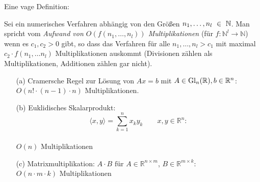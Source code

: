 Eine vage Definition:

\begin{Definition}[Aufwand]
Sei ein numerisches Verfahren abhängig von den Größen $n_1, \ldots, n_l~\in~\mathbb N$.
Man spricht vom
\emph{Aufwand von $O(f(n_1, \dots, n_l))$ Multiplikationen}
(für $f\colon \mathbb{N}^l \to \mathbb{N}$) wenn es
$c_1, c_2 > 0$ gibt, so dass das Verfahren für alle
$n_1, \dots, n_l > c_1$ mit maximal $c_2 \cdot f(n_1, \dots n_l)$
Multiplikationen auskommt (Divisionen zählen als Multiplikationen,
Additionen zählen gar nicht).
\end{Definition}

\begin{Beispiel}[name=Zahl der Multiplikationen in verschiedenen Rechnungen,listhack]
\quad
\begin{enumerate}
\item[(a)]
Cramersche Regel zur Lösung von $Ax = b$ mit $A \in \mathrm{Gl}_n(\mathbb R),
b \in \mathbb{R}^n$: \\
$O(n! \cdot (n-1)\cdot n)$ Multiplikationen.
\item[(b)]
Euklidisches Skalarprodukt:
$$\langle x,y \rangle = \sum_{k=1}^n x_k y_k \qquad x,y \in \mathbb{R}^n:$$ \\
$O(n)$ Multiplikationen
\item[(c)]
Matrixmultiplikation: $A \cdot B \text{ für } A\in
\mathbb{R}^{n \times m}$, $B \in \mathbb{R}^{m \times k}$: \\
$O(n \cdot m \cdot k ) $ Multiplikationen
\end{enumerate}
\end{Beispiel}


